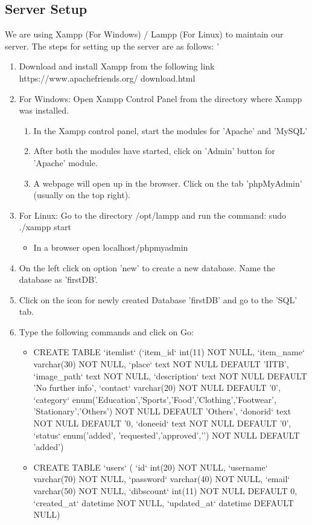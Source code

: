 \documentclass[12pt, a4paper]{article}
\begin{document}
\subsection{Server Setup}
We are using Xampp (For Windows) / Lampp (For Linux) to maintain our server. 
The steps for setting up the server are as follows:
'\begin{enumerate}
    \item Download and install Xampp from the following link https://www.apachefriends.org/ download.html
    \item For Windows: Open Xampp Control Panel from the directory where Xampp was installed.
    \begin{enumerate}
        \item In the Xampp control panel, start the modules for 'Apache' and 'MySQL'
        \item After both the modules have started, click on 'Admin' button for 'Apache' module.
        \item A webpage will open up in the browser. Click on the tab 'phpMyAdmin' (usually on the top right).
    \end{enumerate}
    \item For Linux: Go to the directory /opt/lampp and run the command: sudo ./xampp start
    \begin{itemize}
        \item In a browser open localhost/phpmyadmin
    \end{itemize}
    \item On the left click on option 'new' to create a new database. Name the database as 'firstDB'.
    \item Click on the icon for newly created Database 'firstDB' and go to the 'SQL' tab.
    \item Type the following commands and click on Go:
    \begin{itemize}
        \item CREATE TABLE `itemlist` (`item\_id` int(11) NOT NULL, `item\_name` varchar(30) NOT NULL, `place` text NOT NULL DEFAULT 'IITB', `image\_path` text NOT NULL, `description` text NOT NULL DEFAULT 'No further info', `contact` varchar(20) NOT NULL DEFAULT '0', `category` enum('Education','Sports','Food','Clothing','Footwear', 'Stationary','Others') NOT NULL DEFAULT 'Others', `donorid` text NOT NULL DEFAULT '0,  `doneeid` text NOT NULL DEFAULT '0', `status` enum('added', 'requested','approved','') NOT NULL DEFAULT 'added')
        \item CREATE TABLE `users` ( `id` int(20) NOT NULL, `username` varchar(70) NOT NULL, `password` varchar(40) NOT NULL, `email` varchar(50) NOT NULL, `dibscount` int(11) NOT NULL DEFAULT 0, `created\_at` datetime NOT NULL, `updated\_at` datetime DEFAULT NULL)

\end{itemize}
\end{enumerate}
\end{document}
